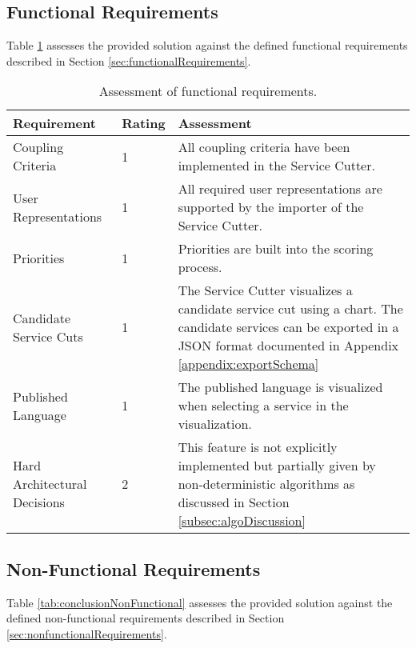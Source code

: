 \subsection{Functional Requirements}

Table \ref{tab:conclusionFunctional} assesses the provided solution against the defined functional requirements described in Section \ref{sec:functionalRequirements}.

\begin{table}[H]
	\centering
	\caption{Assessment of functional requirements.}
	\label{tab:conclusionFunctional}
	\begin{tabular}{|p{100pt}|l|p{250pt}|}
	\hline \textbf{Requirement} & \textbf{Rating} & \textbf{Assessment} \\ 
	\hline Coupling Criteria & 1 & All coupling criteria have been implemented in the Service Cutter.  \\ 
	\hline User Representations & 1 & All required user representations are supported by the importer of the Service Cutter. \\ 
	\hline Priorities & 1 & Priorities are built into the scoring process. \\ 
	\hline Candidate Service Cuts & 1 & The Service Cutter visualizes a candidate service cut using a chart. The candidate services can be exported in a \gls{JSON} format documented in Appendix \ref{appendix:exportSchema} \\ 
	\hline Published Language & 1 & The published language is visualized when selecting a service in the visualization.  \\ 
	\hline Hard Architectural Decisions & 2 & This feature is not explicitly implemented but partially given by non-deterministic algorithms as discussed in Section \ref{subsec:algoDiscussion}\\
	\hline 
	\end{tabular} 
\end{table}

\clearpage
\subsection{Non-Functional Requirements}

Table \ref{tab:conclusionNonFunctional} assesses the provided solution against the defined non-functional requirements described in Section \ref{sec:nonfunctionalRequirements}. 

